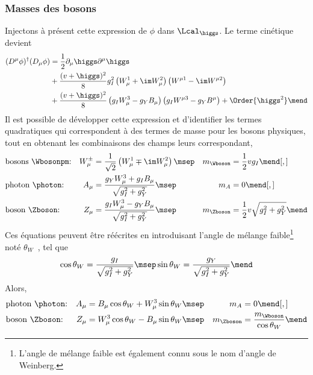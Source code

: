 \subsubsection{Masses des bosons}\label{chapter-MS-MSSM-section-formalisme-subsec-Higgs_mechanism-subsubsec-bosons}
Injectons à présent cette expression de $\phi$ dans $\Lcal_{\higgs}$. Le terme cinétique devient
\begin{align}
(D^\mu\phi)^\dagger(D_\mu\phi)
&
=
\frac{1}{2}\partial_\mu \higgs \partial^\mu \higgs
\nonumber\\&
+
\frac{(v+\higgs)^2}{8} g_I^2 \left(W_\mu^1 + \im W_\mu^2\right) \left( W^{\mu1}-\im W^{\mu2}\right)
\nonumber\\&
+
\frac{(v+\higgs)^2}{8} \left(g_I W_\mu^3 - g_Y B_\mu \right) \left( g_I W^{\mu3}-g_Y B^\mu \vphantom{W^{\mu1}}\right)
+ \Order{\higgs^2}
\mend
\end{align}
Il est possible de développer cette expression et d'identifier les termes quadratiques qui correspondent à des termes de masse pour les bosons physiques, tout en obtenant les combinaisons des champs leurs correspondant,
\begin{align}
&
\text{bosons \Wbosonpm:}
&
W_\mu^\pm &= \frac{1}{\sqrt{2}} \left( W_\mu^1 \mp \im W_\mu^2 \right)
\msep&
m_{\Wboson} &= \frac{1}{2} v g_I
\mend[,]
\\
&
\text{photon \photon:}
&
A_\mu &= \frac{g_Y W_\mu^3 + g_I B_\mu}{\sqrt{g_I^2 + g_Y^2}}
\msep&
m_A &= 0
\mend[,]
\\
&
\text{boson \Zboson:}
&
Z_\mu &= \frac{g_I W_\mu^3 - g_Y B_\mu}{\sqrt{g_I^2 + g_Y^2}}
\msep&
m_{\Zboson} &= \frac{1}{2} v \sqrt{g_I^2 + g_Y^2}
\mend
\end{align}
Ces équations peuvent être réécrites en introduisant l'angle de mélange faible\footnote{L'angle de mélange faible est également connu sous le nom d'angle de Weinberg.} noté $\theta_W$~\cite{GLASHOW1961579}, tel que
\begin{equation}
\cos\theta_W = \frac{g_I}{\sqrt{g_I^2 + g_Y^2}}
\msep
\sin\theta_W = \frac{g_Y}{\sqrt{g_I^2 + g_Y^2}}
\mend
\label{eq-chapter-MS-MSSM-section-formalisme-subsec-Higgs_mechanism-thetaW}
\end{equation}
Alors,
\begin{align}
&
\text{photon \photon:}
&
A_\mu &= B_\mu \cos\theta_W + W_\mu^3 \sin\theta_W
\msep&
m_A &= 0
\mend[,]
\\
&
\text{boson \Zboson:}
&
Z_\mu &= W_\mu^3 \cos\theta_W - B_\mu \sin\theta_W
\msep&
m_{\Zboson} &= \frac{m_{\Wboson}}{\cos\theta_W}
\mend
\end{align}
